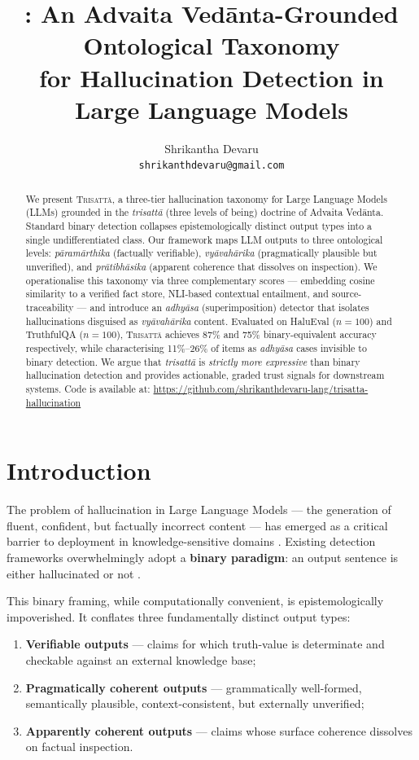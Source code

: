 \documentclass[11pt]{article}
\title{\system: An Advaita Ved\={a}nta-Grounded Ontological Taxonomy\\
       for Hallucination Detection in Large Language Models}
\author{
  Shrikantha Devaru \\
  \texttt{shrikanthdevaru@gmail.com}
}
\newcommand{\param}{\textcolor{paramcol}{\textit{pāramārthika}}}
\newcommand{\vyav}{\textcolor{vyavcol}{\textit{vyāvahārika}}}
\newcommand{\prati}{\textcolor{praticol}{\textit{prātibhāsika}}}
\newcommand{\adhyasa}{\textcolor{adhyasacol}{\textit{adhyāsa}}}
\newcommand{\trisatta}{\textit{trisattā}}
\newcommand{\system}{\textsc{Trisatt\={a}}}
\begin{document}
\maketitle

\begin{abstract}
We present \system{}, a three-tier hallucination taxonomy for Large Language
Models (LLMs) grounded in the \trisatta{} (three levels of being) doctrine of
Advaita Ved\={a}nta. Standard binary detection collapses epistemologically
distinct output types into a single undifferentiated class. Our framework maps
LLM outputs to three ontological levels: \param{} (factually verifiable),
\vyav{} (pragmatically plausible but unverified), and \prati{} (apparent
coherence that dissolves on inspection). We operationalise this taxonomy via
three complementary scores — embedding cosine similarity to a verified fact
store, NLI-based contextual entailment, and source-traceability — and introduce
an \adhyasa{} (superimposition) detector that isolates hallucinations disguised
as \vyav{} content. Evaluated on HaluEval ($n=100$) and TruthfulQA ($n=100$),
\system{} achieves 87\% and 75\% binary-equivalent accuracy respectively, while
characterising 11\%--26\% of items as \adhyasa{} cases invisible to binary
detection. We argue that \trisatta{} is \emph{strictly more expressive} than
binary hallucination detection and provides actionable, graded trust signals for
downstream systems. Code is available at: \url{https://github.com/shrikanthdevaru-lang/trisatta-hallucination}
\end{abstract}

\section{Introduction}

The problem of hallucination in Large Language Models --- the generation of
fluent, confident, but factually incorrect content --- has emerged as a critical
barrier to deployment in knowledge-sensitive domains \cite{ji2023survey}. Existing
detection frameworks overwhelmingly adopt a \textbf{binary paradigm}: an output
sentence is either hallucinated or not \cite{maynez2020faithfulness,lin2022truthfulqa}.

This binary framing, while computationally convenient, is epistemologically
impoverished. It conflates three fundamentally distinct output types:
\begin{enumerate}[leftmargin=*,noitemsep]
  \item \textbf{Verifiable outputs} --- claims for which truth-value is
    determinate and checkable against an external knowledge base;
  \item \textbf{Pragmatically coherent outputs} --- grammatically well-formed,
    semantically plausible, context-consistent, but externally unverified;
  \item \textbf{Apparently coherent outputs} --- claims whose surface coherence
    dissolves on factual inspection.
\end{enumerate}
\end{document}
